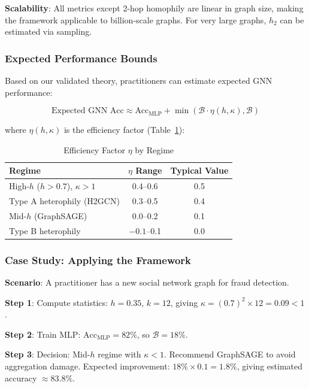 \textbf{Scalability}: All metrics except 2-hop homophily are linear in graph size, making the framework applicable to billion-scale graphs. For very large graphs, $h_2$ can be estimated via sampling.

\subsubsection{Expected Performance Bounds}

Based on our validated theory, practitioners can estimate expected GNN performance:

\begin{equation}
\text{Expected GNN Acc} \approx \text{Acc}_{\text{MLP}} + \min\left(\mathcal{B} \cdot \eta(h, \kappa), \mathcal{B}\right)
\end{equation}

where $\eta(h, \kappa)$ is the efficiency factor (Table~\ref{tab:efficiency_estimates}):

\begin{table}[t]
\centering
\caption{Efficiency Factor $\eta$ by Regime}
\label{tab:efficiency_estimates}
\small
\begin{tabular}{@{}lcc@{}}
\toprule
\textbf{Regime} & \textbf{$\eta$ Range} & \textbf{Typical Value} \\
\midrule
High-$h$ ($h > 0.7$), $\kappa > 1$ & 0.4--0.6 & 0.5 \\
Type A heterophily (H2GCN) & 0.3--0.5 & 0.4 \\
Mid-$h$ (GraphSAGE) & 0.0--0.2 & 0.1 \\
Type B heterophily & $-0.1$--0.1 & 0.0 \\
\bottomrule
\end{tabular}
\end{table}

\subsubsection{Case Study: Applying the Framework}

\textbf{Scenario}: A practitioner has a new social network graph for fraud detection.

\textbf{Step 1}: Compute statistics: $h = 0.35$, $k = 12$, giving $\kappa = (0.7)^2 \times 12 = 0.09 < 1$.

\textbf{Step 2}: Train MLP: $\text{Acc}_{\text{MLP}} = 82\%$, so $\mathcal{B} = 18\%$.

\textbf{Step 3}: Decision: Mid-$h$ regime with $\kappa < 1$. Recommend GraphSAGE to avoid aggregation damage. Expected improvement: $18\% \times 0.1 = 1.8\%$, giving estimated accuracy $\approx 83.8\%$.

